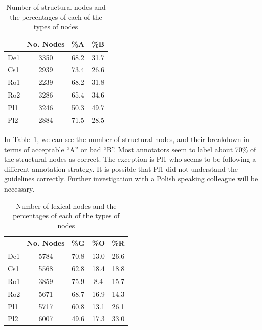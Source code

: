 \documentclass[11pt]{article}
\begin{document}
\begin{table}[h!]
\begin{center}
      \begin{tabular}{|l|c|c|c|}
      \hline
   & \bf{No. Nodes} & \bf{\%A} & \bf{\%B}   \\
\hline                               
    De1  &  3350 &  68.2 & 31.7  \\ 
    Cs1  & 2939 &  73.4 & 26.6 \\ 
    Ro1  & 2239 &  68.2 & 31.8  \\ 
    Ro2  & 3286 &  65.4 & 34.6 \\ 
    Pl1  & 3246 &  50.3 & 49.7 \\ 
    Pl2  & 2884 &  71.5 & 28.5 \\ 
      \hline
    \end{tabular}
\end{center}
\normalsize
\vspace*{-3ex}
\caption{Number of structural  nodes and the percentages of each of the types of nodes
}
\label{tab:stat-struct}
\end{table}

In Table~\ref{tab:stat-struct}, we can see the number of structural nodes, and their
breakdown in terms of acceptable  ``A'' or bad ``B''. Most annotators seem to 
label about 70\% of the structural nodes as correct. The exception is Pl1 who
seems to be following a different annotation strategy. It is possible that Pl1 
did not understand the guidelines correctly. Further investigation with a Polish
speaking colleague will be necessary.

\begin{table}[h!]
\begin{center}
      \begin{tabular}{|l|c|c|c|c|}
      \hline
   & \bf{No. Nodes} & \bf{\%G} & \bf{\%O}  & \bf{\%R} \\
\hline                               
    De1  & 5784  &  70.8 & 13.0 & 26.6  \\ 
    Cs1  & 5568 &  62.8 & 18.4 & 18.8 \\ 
    Ro1  & 3859 &  75.9 & 8.4 & 15.7  \\ 
    Ro2  & 5671 &  68.7 & 16.9 & 14.3 \\ 
    Pl1  & 5717 &  60.8 & 13.1 & 26.1 \\ 
    Pl2  & 6007 &  49.6  & 17.3 & 33.0 \\ 
      \hline
    \end{tabular}
\end{center}
\normalsize
\vspace*{-3ex}
\caption{Number of lexical  nodes and the percentages of each of the types of nodes
}
\label{tab:stat-lex}
\end{table}
\end{document}

